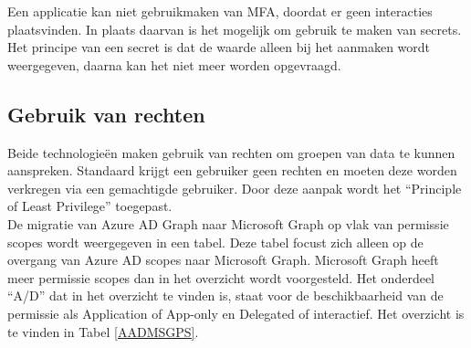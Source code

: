 Een applicatie kan niet gebruikmaken van \ac{MFA}, doordat er geen interacties plaatsvinden. In plaats daarvan is het mogelijk om gebruik te maken van secrets. Het principe van een secret is dat de waarde alleen bij het aanmaken wordt weergegeven, daarna kan het niet meer worden opgevraagd.

\subsection{Gebruik van rechten}



Beide technologieën maken gebruik van rechten om groepen van data te kunnen aanspreken. Standaard krijgt een gebruiker geen rechten en moeten deze worden verkregen via een gemachtigde gebruiker. Door deze aanpak wordt het “Principle of Least Privilege” toegepast. \\

De migratie van Azure \ac{AD} Graph naar Microsoft Graph op vlak van permissie scopes wordt weergegeven in een tabel. Deze tabel focust zich alleen op de overgang van Azure \ac{AD} scopes naar Microsoft Graph. Microsoft Graph heeft meer permissie scopes dan in het overzicht wordt voorgesteld. Het onderdeel “A/D” dat in het overzicht te vinden is, staat voor de beschikbaarheid van de permissie als Application of App-only en Delegated of interactief. Het overzicht is te vinden in Tabel \ref{AADMSGPS}. \\

